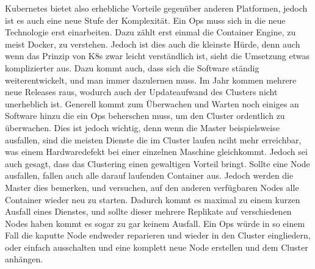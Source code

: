 Kubernetes bietet also erhebliche Vorteile gegenüber anderen Platformen, jedoch ist es auch eine neue Stufe der Komplexität.
Ein Ops muss sich in die neue Technologie erst einarbeiten. Dazu zählt erst einmal die Container Engine, zu meist Docker, zu verstehen.
Jedoch ist dies auch die kleinste Hürde, denn auch wenn das Prinzip von K8s zwar leicht verständlich ist, sieht die Umsetzung etwas komplizierter aus.
Dazu kommt auch, dass sich die Software ständig weiterentwickelt, und man immer dazulernen muss. Im Jahr kommen mehrere neue Releases raus, wodurch 
auch der Updateaufwand des Clusters nicht unerheblich ist. Generell kommt zum Überwachen und Warten noch einiges an Software hinzu die ein Ops beherschen muss, um 
den Cluster ordentlich zu überwachen.
Dies ist jedoch wichtig, denn wenn die Master beispielsweise ausfallen, sind die meisten Dienste die im Cluster laufen nciht mehr erreichbar, was einem Hardwaredefekt bei einer einzelnen Maschine gleichkommt.
Jedoch sei auch gesagt, dass das Clustering einen gewaltigen Vorteil bringt. Sollte eine Node ausfallen, fallen auch alle darauf laufenden Container aus. Jedoch werden die Master dies bemerken, 
und versuchen, auf den anderen verfügbaren Nodes alle Container wieder neu zu starten. Dadurch kommt es maximal zu einem kurzen Ausfall eines Dienstes, und sollte dieser mehrere Replikate auf verschiedenen Nodes haben kommt es sogar zu gar keinem Ausfall.
Ein Ops würde in so einem Fall die kaputte Node endweder reparieren und wieder in den Cluster eingliedern, oder einfach ausschalten und eine komplett neue Node erstellen und dem Cluster anhängen.